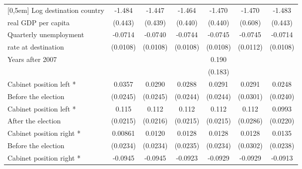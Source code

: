 \begin{table}[htbp]
\begin{tabular}{l*{6}{c}}
[0,5em]
Log destination country &      -1.484\sym{**} &      -1.447\sym{**} &      -1.464\sym{**} &      -1.470\sym{**} &      -1.470\sym{*}  &      -1.483\sym{**} \\
real GDP per capita     &     (0.443)         &     (0.439)         &     (0.440)         &     (0.440)         &     (0.608)         &     (0.443)         \\
[0,5em]
Quarterly unemployment &     -0.0714\sym{***}&     -0.0740\sym{***}&     -0.0744\sym{***}&     -0.0745\sym{***}&     -0.0745\sym{***}&     -0.0714\sym{***}\\
rate at destination    &    (0.0108)         &    (0.0108)         &    (0.0108)         &    (0.0108)         &    (0.0112)         &    (0.0108)         \\
[0,5em]
Years after 2007          &                     &                     &                     &       0.190         &                     &                     \\
                    &                     &                     &                     &     (0.183)         &                     &                     \\
[0,5em]
Cabinet position left * &      0.0357         &      0.0290         &      0.0288         &      0.0291         &      0.0291         &      0.0248         \\
Before the election                    &    (0.0245)         &    (0.0245)         &    (0.0244)         &    (0.0244)         &    (0.0301)         &    (0.0240)         \\
[0,5em]
Cabinet position left * &       0.115\sym{***}&       0.112\sym{***}&       0.112\sym{***}&       0.112\sym{***}&       0.112\sym{***}&      0.0993\sym{***}\\
After the election                    &    (0.0215)         &    (0.0216)         &    (0.0215)         &    (0.0215)         &    (0.0286)         &    (0.0220)         \\
[0,5em]
Cabinet position right * &     0.00861         &      0.0120         &      0.0128         &      0.0128         &      0.0128         &      0.0135         \\
Before the election                    &    (0.0234)         &    (0.0234)         &    (0.0235)         &    (0.0234)         &    (0.0302)         &    (0.0238)         \\
[0,5em]
Cabinet position right * &     -0.0945\sym{***}&     -0.0945\sym{***}&     -0.0923\sym{***}&     -0.0929\sym{***}&     -0.0929\sym{**} &     -0.0913\sym{***}\\

\end{tabular}
\end{table}
